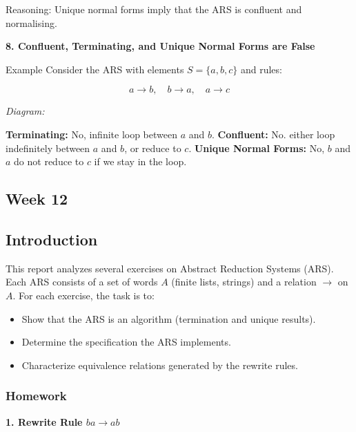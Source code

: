 \documentclass{article}
\theoremstyle{theorem}
\theoremstyle{definition}
\theoremstyle{remark}
\begin{document}
{  Reasoning: Unique normal forms imply that the ARS is confluent and normalising.


  \textbf{8. Confluent, Terminating, and Unique Normal Forms are False}


  Example Consider the ARS with elements \( S = \{ a, b, c \} \) and rules:

  \[
    a \to b, \quad b \to a, \quad a \to c
  \]

  \textit{Diagram:}

  \begin{center}
  \end{center}

  \textbf{Terminating:} No, infinite loop between \( a \) and \( b \).
  \textbf{Confluent:} No. either loop indefinitely between \( a \) and \( b \), or reduce to \( c \).
\textbf{Unique Normal Forms:} No, \( b \) and \( a \) do not reduce to \( c \) if we stay in the loop.

\subsection{Week 12}

\subsection*{Introduction}

This report analyzes several exercises on Abstract Reduction Systems (ARS). Each ARS consists of a set of words \( A \) (finite lists, strings) and a relation \( \to \) on \( A \). For each exercise, the task is to:
\begin{itemize}
    \item Show that the ARS is an algorithm (termination and unique results).
    \item Determine the specification the ARS implements.
    \item Characterize equivalence relations generated by the rewrite rules.
\end{itemize}
  \subsubsection*{Homework}
  \textbf{1. Rewrite Rule \( ba \to ab \)}

}
\end{document}

